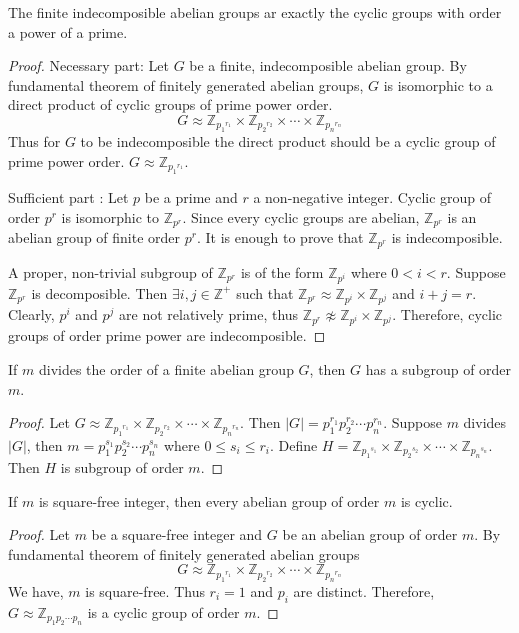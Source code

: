 \begin{theorem}
	The finite indecomposible abelian groups ar exactly the cyclic groups with order a power of a prime.
\end{theorem}
\begin{proof}
	Necessary part: 
	Let $G$ be a finite, indecomposible abelian group.
	By fundamental theorem of finitely generated abelian groups, $G$ is isomorphic to a direct product of cyclic groups of prime power order.
	$$ G \approx \mathbb{Z}_{{p_1}^{r_1}} \times \mathbb{Z}_{{p_2}^{r_2}} \times \cdots \times \mathbb{Z}_{{p_n}^{r_n}}$$
	Thus for $G$ to be indecomposible the direct product should be a cyclic group of prime power order.
	$G \approx \mathbb{Z}_{{p_1}^{r_1}}$.

	Sufficient part :
	Let $p$ be a prime and $r$ a non-negative integer.
	Cyclic group of order $p^r$ is isomorphic to $\mathbb{Z}_{p^r}$.
	Since every cyclic groups are abelian, $\mathbb{Z}_{p^r}$ is an abelian group of finite order $p^r$.
	It is enough to prove that $\mathbb{Z}_{p^r}$ is indecomposible.

	A proper, non-trivial subgroup of $\mathbb{Z}_{p^r}$ is of the form $\mathbb{Z}_{p^i}$ where $0 < i < r$.
	Suppose $\mathbb{Z}_{p^r}$ is decomposible.
	Then $\exists i,j \in \mathbb{Z}^+$ such that $\mathbb{Z}_{p^r} \approx \mathbb{Z}_{p^i} \times \mathbb{Z}_{p^j}$ and $i+j=r$.
	Clearly, $p^i$ and $p^j$ are not relatively prime, thus $\mathbb{Z}_{p^r} \not\approx \mathbb{Z}_{p^i} \times \mathbb{Z}_{p^j}$.
	Therefore, cyclic groups of order prime power are indecomposible.
\end{proof}

\begin{theorem}
	If $m$ divides the order of a finite abelian group $G$, then $G$ has a subgroup of order $m$.
\end{theorem}
\begin{proof}
	Let $G \approx \mathbb{Z}_{{p_1}^{r_1}} \times \mathbb{Z}_{{p_2}^{r_2}} \times \cdots \times \mathbb{Z}_{{p_n}^{r_n}}$.
	Then $|G| = p_1^{r_1} p_2^{r_2} \cdots p_n^{r_n}$.
	Suppose $m$ divides $|G|$, then $m = p_1^{s_1} p_2^{s_2} \cdots p_n^{s_n}$ where $0 \le s_i \le r_i$.
	Define $H = \mathbb{Z}_{{p_1}^{s_1}} \times \mathbb{Z}_{{p_2}^{s_2}} \times \cdots \times \mathbb{Z}_{{p_n}^{s_n}}$.
	Then $H$ is subgroup of order $m$.
\end{proof}

\begin{theorem}
	If $m$ is square-free integer, then every abelian group of order $m$ is cyclic.
\end{theorem}
\begin{proof}
	Let $m$ be a square-free integer and $G$ be an abelian group of order $m$.
	By fundamental theorem of finitely generated abelian groups
	$$ G \approx \mathbb{Z}_{{p_1}^{r_1}} \times \mathbb{Z}_{{p_2}^{r_2}} \times \cdots \times \mathbb{Z}_{{p_n}^{r_n}}$$
	We have, $m$ is square-free.
	Thus $r_i = 1$ and $p_i$ are distinct.
	Therefore, $G \approx \mathbb{Z}_{p_1 p_2 \cdots p_n}$ is a cyclic group of order $m$.
\end{proof}


